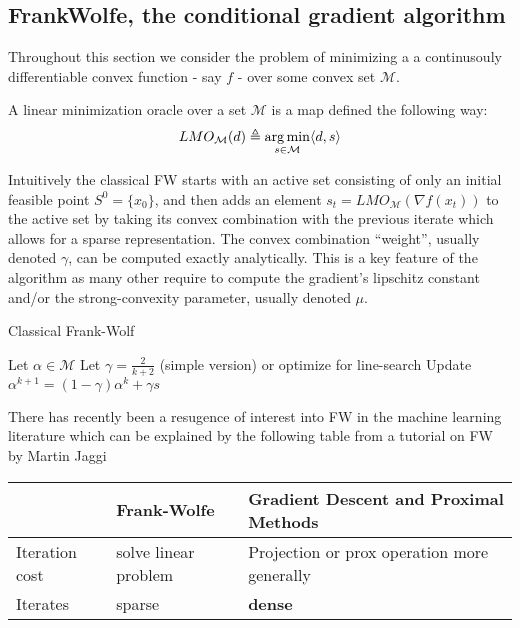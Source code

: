 \subsection{Frank\-Wolfe, the conditional gradient algorithm}
Throughout this section we consider the problem of minimizing a
a continusouly differentiable convex function - say $f$ - over some convex set
$\mathcal M$.
\begin{definition}
  A linear minimization oracle over a set $\mathcal M$ is a map defined the following way:
  \begin{equation}
    LMO_{\mathcal{M}}(d) \triangleq \operatorname*{\arg\min}_{s \in\mathcal{M}}\langle d, s \rangle
    \label{eq:lmo}
  \end{equation}
\end{definition}


Intuitively the classical FW starts with an active set consisting of only an initial feasible
point $S^{0}= \{x_{0}\}$, and then adds an element $s_{t}=
LMO_{\mathcal{M}}(\nabla f(x_{t}))$ to the active set by taking its
convex combination with the previous iterate which allows for a sparse
representation. The convex combination ``weight'', usually denoted $\gamma$,
can be computed exactly analytically. This is a key feature of the algorithm
as many other require to compute the gradient's lipschitz constant and/or the
strong-convexity parameter, usually denoted $\mu$.

\begin{algorithm}[htbp!]
  \caption{Classical Frank-Wolf}
  \label{alg:fw}
\begin{algorithmic}
   \STATE Let $\alpha\in\mathcal{M}$
   \STATE Let $\gamma = \frac{2}{k+2}$ (simple version) or optimize for line-search
   \STATE Update $\alpha^{k+1}= (1-\gamma)\alpha^{k}+ \gamma s$
   \ENDFOR
\end{algorithmic}
\end{algorithm}

There has recently been a resugence of interest into FW in the machine learning
literature which can be explained by the following table from a tutorial on FW
by Martin Jaggi \citet{jaggiFrankWolfeOptimizationAlgorithms2014}
\begin{table}[htbp!]
  \center
  \begin{tabular}{|l|l|l|}
  \hline
  & Frank-Wolfe & Gradient Descent and Proximal Methods\\
  \hline
  Iteration cost & solve linear problem & Projection or prox operation more generally\\
  \hline
  Iterates & sparse & \textbf{dense}\\
  \hline
  \end{tabular}
\end{table}

